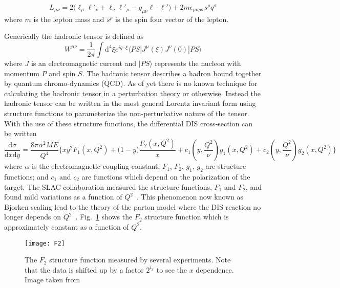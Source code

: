 \begin{equation}
  L_{\mu\nu} = 2\Big(\ell_{\mu}\ell'_{\nu} + \ell_{\nu}\ell'_{\mu} -
  g_{\mu\nu}\ell \cdot \ell' \Big) +
  2m\epsilon_{\mu\nu\rho\sigma}s^{\rho}q^{\sigma}
\end{equation}
\noindent
where $m$ is the lepton mass and $s^{\rho}$ is the spin four vector of the
lepton.

Generically the hadronic tensor is defined as
\begin{equation}
  W^{\mu\nu} = \frac{1}{2\pi}
  \int \mathrm{d}^4\xi e^{iq \cdot \xi}
  \langle PS | J^{\mu}(\xi)J^{\nu}(0) | PS \rangle
\end{equation}
\noindent
where $J$ is an electromagnetic current and $|PS \rangle$ represents the nucleon
with momentum $P$ and spin $S$.  The hadronic tensor describes a hadron bound
together by quantum chromo-dynamics (QCD).  As of yet there is no known
technique for calculating the hadronic tensor in a perturbation theory or
otherwise.  Instead the hadronic tensor can be written in the most general
Lorentz invariant form using structure functions to parameterize the
non-perturbative nature of the tensor.  With the use of these structure
functions, the differential DIS cross-section can be written
\begin{equation}
  \label{equ::DIS_diffxsection}
  \frac{\mathrm{d}\sigma}{\mathrm{d}x\mathrm{d}y} =
  \frac{8\pi\alpha^2ME}{Q^4}
  \Big\{
  xy^2F_1(x, Q^2) + \Big(1-y\Big)\frac{F_2(x, Q^2)}{x}
  + c_1(y, \frac{Q^2}{\nu}) g_1(x, Q^2) + c_2(y, \frac{Q^2}{\nu}) g_2(x, Q^2)
  \Big \}
\end{equation}
\noindent
where $\alpha$ is the electromagnetic coupling constant; $F_1$, $F_2$, $g_1$,
$g_2$ are structure functions; and $c_1$ and $c_2$ are functions which depend on
the polarization of the target.  The SLAC collaboration measured the structure
functions, $F_1$ and $F_2$, and found mild variations as a function of
$Q^2$~\cite{Bloom:1969kc,Breidenbach:1969kd}.  This phenomenon now known as
Bjorken scaling lead to the theory of the parton model where the DIS reaction no
longer depends on $Q^2$~\cite{Bjorken:1969ja}.  Fig.~\ref{fig::F2} shows the
$F_2$ structure function which is approximately constant as a function of $Q^2$.

\begin{figure}[h!t]
  \centering
  \texttt{[image: F2]}
  \caption{The $F_2$ structure function measured by several experiments.  Note
    that the data is shifted up by a factor $2^{i_x}$ to see the $x$ dependence.
    Image taken from~\cite{Tanabashi:2018oca}}
  \label{fig::F2}
\end{figure}


